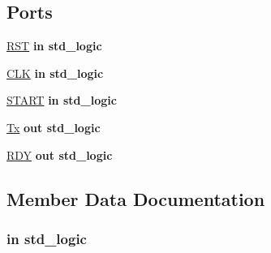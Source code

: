 \subsection*{Ports}
 \begin{DoxyCompactItemize}
\item 
\hyperlink{class_r_s232_write__16_a98682ef7de2714e5bab788a2e2ff1b7f}{R\+S\+T}  {\bfseries {\bfseries \textcolor{keywordflow}{in}\textcolor{vhdlchar}{ }}} {\bfseries \textcolor{comment}{std\+\_\+logic}\textcolor{vhdlchar}{ }} 
\item 
\hyperlink{class_r_s232_write__16_ab5d0ea9e968d49d94da9db07a979d402}{C\+L\+K}  {\bfseries {\bfseries \textcolor{keywordflow}{in}\textcolor{vhdlchar}{ }}} {\bfseries \textcolor{comment}{std\+\_\+logic}\textcolor{vhdlchar}{ }} 
\item 
\hyperlink{class_r_s232_write__16_a85be3e029f471189e7375b9096e537b8}{S\+T\+A\+R\+T}  {\bfseries {\bfseries \textcolor{keywordflow}{in}\textcolor{vhdlchar}{ }}} {\bfseries \textcolor{comment}{std\+\_\+logic}\textcolor{vhdlchar}{ }} 
\item 
\hyperlink{class_r_s232_write__16_a447d59a050c4bcc20d40ab5c940b17dd}{Tx}  {\bfseries {\bfseries \textcolor{keywordflow}{out}\textcolor{vhdlchar}{ }}} {\bfseries \textcolor{comment}{std\+\_\+logic}\textcolor{vhdlchar}{ }} 
\item 
\hyperlink{class_r_s232_write__16_a55705306de14b0deb930f8f028a6a288}{R\+D\+Y}  {\bfseries {\bfseries \textcolor{keywordflow}{out}\textcolor{vhdlchar}{ }}} {\bfseries \textcolor{comment}{std\+\_\+logic}\textcolor{vhdlchar}{ }} 
\end{DoxyCompactItemize}


\subsection{Member Data Documentation}
\hypertarget{class_r_s232_write__16_ab5d0ea9e968d49d94da9db07a979d402}{}
\subsubsection[{C\+L\+K}]{ {\bfseries \textcolor{keywordflow}{in}\textcolor{vhdlchar}{ }} {\bfseries \textcolor{comment}{std\+\_\+logic}\textcolor{vhdlchar}{ }} \hspace{0.3cm}{\ttfamily [Port]}}\label{class_r_s232_write__16_ab5d0ea9e968d49d94da9db07a979d402}
\hypertarget{class_r_s232_write__16_ae4f03c286607f3181e16b9aa12d0c6d4}{}
